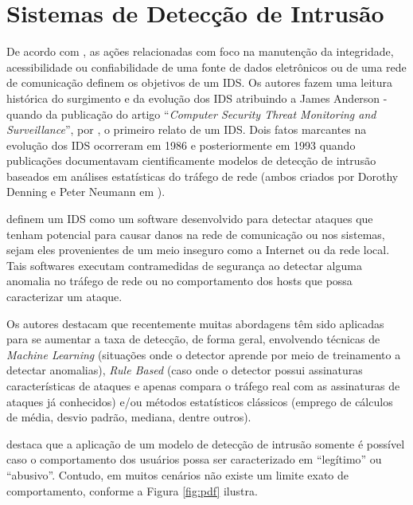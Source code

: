 \section{Sistemas de Detecção de Intrusão}

\label{sec:ids}

De acordo com , as ações relacionadas com foco na manutenção da integridade, acessibilidade ou confiabilidade de uma fonte de dados eletrônicos ou de uma rede de comunicação definem os objetivos de um IDS. Os autores fazem uma leitura histórica do surgimento e da evolução dos IDS atribuindo a James Anderson - quando da publicação do artigo ``\textit{Computer Security Threat Monitoring and Surveillance}'', por , o primeiro relato de um IDS. Dois fatos marcantes na evolução dos IDS ocorreram em 1986 e posteriormente em 1993 quando publicações documentavam cientificamente modelos de detecção de intrusão baseados em análises estatísticas do tráfego de rede (ambos criados por Dorothy Denning e Peter Neumann em ).

 definem um IDS como um software desenvolvido para detectar ataques que tenham potencial para causar danos na rede de comunicação ou nos sistemas, sejam eles provenientes de um meio inseguro como a Internet ou da rede local. Tais softwares executam contramedidas de segurança ao detectar alguma anomalia no tráfego de rede ou no comportamento dos hosts que possa caracterizar um ataque.

Os autores destacam que recentemente muitas abordagens têm sido aplicadas para se aumentar a taxa de detecção, de forma geral, envolvendo técnicas de \textit{Machine Learning} (situações onde o detector aprende por meio de treinamento a detectar anomalias), \textit{Rule Based} (caso onde o detector possui assinaturas características de ataques e apenas compara o tráfego real com as assinaturas de ataques já conhecidos) e/ou métodos estatísticos clássicos (emprego de cálculos de média, desvio padrão, mediana, dentre outros).

 destaca que a aplicação de um modelo de detecção de intrusão somente é possível caso o comportamento dos usuários possa ser caracterizado em ``legítimo'' ou ``abusivo''. Contudo, em muitos cenários não existe um limite exato de comportamento, conforme a Figura \ref{fig:pdf} ilustra.

